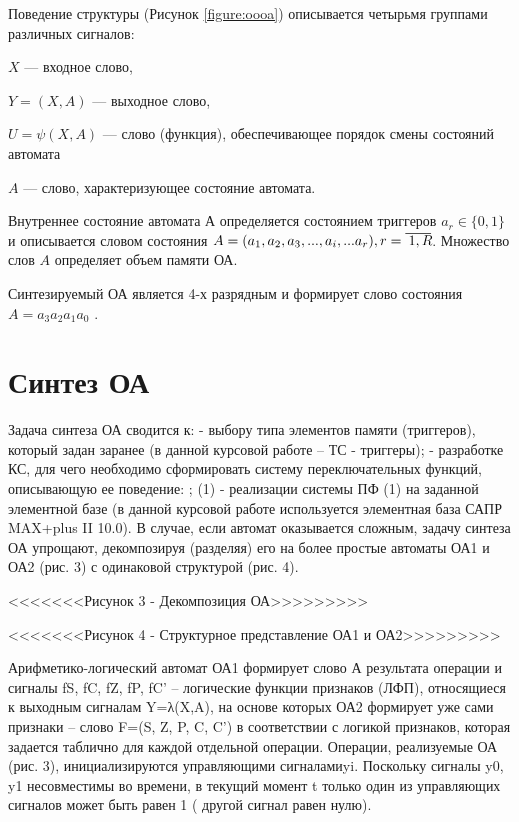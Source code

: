 Поведение структуры (Рисунок \ref{figure:oooa}) описывается четырьмя группами различных сигналов:

$X$ --- входное слово,

$Y = (X,A)$ --- выходное слово,

$U = \psi(X,A)$ --- слово (функция), обеспечивающее порядок смены состояний автомата

$A$ --- слово, характеризующее состояние автомата.

Внутреннее состояние автомата $А$ определяется состоянием триггеров $a_r \in \{0, 1\}$  и описывается словом состояния $A = (a_1, a_2, a_3, ..., a_i, ... a_r), r = \oline{1,R}$. Множество слов $A$ определяет объем памяти ОА.

Синтезируемый ОА является 4-х разрядным и формирует слово состояния $A = a_3a_2a_1a_0$ .


\newpage
\section{Синтез ОА}

Задача синтеза ОА сводится к:
-   выбору типа элементов памяти (триггеров), который задан заранее (в данной курсовой работе – ТС - триггеры);
- разработке КС, для чего необходимо сформировать систему переключательных функций, описывающую ее поведение:
 ;	                          				                       (1)
-  реализации системы ПФ (1) на заданной элементной базе (в данной курсовой работе используется элементная база САПР MAX+plus II 10.0).
В случае, если автомат оказывается сложным, задачу синтеза ОА упрощают, декомпозируя (разделяя) его на более простые автоматы ОА1 и ОА2 (рис. 3) с одинаковой структурой (рис. 4).

<<<<<<<Рисунок 3 - Декомпозиция ОА>>>>>>>>>

<<<<<<<Рисунок 4 - Структурное представление ОА1 и ОА2>>>>>>>>>

Арифметико-логический автомат ОА1 формирует слово А результата операции и сигналы fS, fC, fZ, fP, fC’ – логические функции признаков (ЛФП), относящиеся к выходным сигналам Y=λ(X,A), на основе которых ОА2 формирует уже сами признаки – слово F=(S, Z, P, C, C’) в соответствии с логикой признаков, которая задается таблично для каждой отдельной операции. Операции, реализуемые ОА (рис. 3), инициализируются управляющими сигналами{yi}. Поскольку сигналы y0, y1 несовместимы во времени, в текущий момент t только один из управляющих сигналов может быть равен 1 ( другой сигнал равен нулю). 


